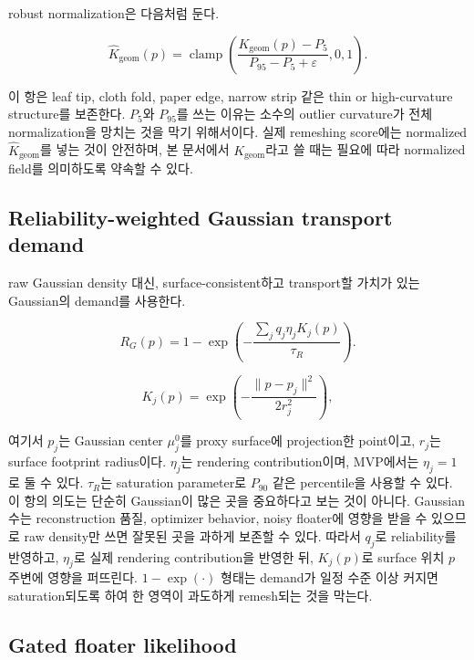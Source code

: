 \documentclass[11pt,a4paper]{article}
\newcommand{\clamp}{\operatorname{clamp}}
\newcommand{\eps}{\varepsilon}
\begin{document}
robust normalization은 다음처럼 둔다.

\begin{equation}
\widehat{K}_{\mathrm{geom}}(p)=\clamp\left(\frac{K_{\mathrm{geom}}(p)-P_5}{P_{95}-P_5+\eps},0,1\right).
\end{equation}

이 항은 leaf tip, cloth fold, paper edge, narrow strip 같은 thin or high-curvature structure를 보존한다.
$P_5$와 $P_{95}$를 쓰는 이유는 소수의 outlier curvature가 전체 normalization을 망치는 것을 막기 위해서이다.
실제 remeshing score에는 normalized $\widehat{K}_{\mathrm{geom}}$를 넣는 것이 안전하며, 본 문서에서 $K_{\mathrm{geom}}$라고 쓸 때는 필요에 따라 normalized field를 의미하도록 약속할 수 있다.

\subsection*{Reliability-weighted Gaussian transport demand}

raw Gaussian density 대신, surface-consistent하고 transport할 가치가 있는 Gaussian의 demand를 사용한다.

\begin{equation}
R_G(p)=1-\exp\left(-\frac{\sum_j q_j\eta_jK_j(p)}{\tau_R}\right).
\end{equation}

\begin{equation}
K_j(p)=\exp\left(-\frac{\|p-p_j\|^2}{2r_j^2}\right),
\end{equation}

여기서 $p_j$는 Gaussian center $\mu_j^0$를 proxy surface에 projection한 point이고, $r_j$는 surface footprint radius이다. $\eta_j$는 rendering contribution이며, MVP에서는 $\eta_j=1$로 둘 수 있다. $\tau_R$는 saturation parameter로 $P_{90}$ 같은 percentile을 사용할 수 있다.
이 항의 의도는 단순히 Gaussian이 많은 곳을 중요하다고 보는 것이 아니다.
Gaussian 수는 reconstruction 품질, optimizer behavior, noisy floater에 영향을 받을 수 있으므로 raw density만 쓰면 잘못된 곳을 과하게 보존할 수 있다.
따라서 $q_j$로 reliability를 반영하고, $\eta_j$로 실제 rendering contribution을 반영한 뒤, $K_j(p)$로 surface 위치 $p$ 주변에 영향을 퍼뜨린다.
$1-\exp(\cdot)$ 형태는 demand가 일정 수준 이상 커지면 saturation되도록 하여 한 영역이 과도하게 remesh되는 것을 막는다.

\subsection*{Gated floater likelihood}
\end{document}
